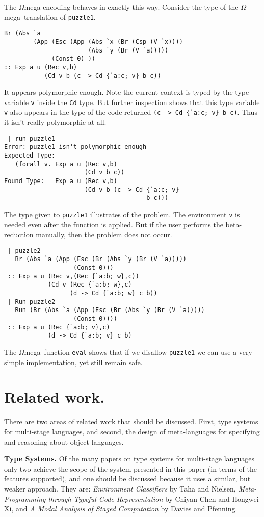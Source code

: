 \documentclass{sigplanconf}
\newcommand{\om}{$\Omega$mega}
\begin{document}
\begin{itemize}
The \om{} encoding behaves in exactly this way. Consider
the type of the \om\ translation of {\tt puzzle1}.
\begin{verbatim}
Br (Abs `a 
        (App (Esc (App (Abs `x (Br (Csp (V `x)))) 
                       (Abs `y (Br (V `a)))))
             (Const 0) ))
:: Exp a u (Rec v,b) 
           (Cd v b (c -> Cd {`a:c; v} b c))
\end{verbatim}
It appears polymorphic enough. Note the current
context is typed by the type variable {\tt v} inside the {\tt Cd} type. But further
inspection shows that this type variable {\tt v} also appears
in the type of the code returned \verb+(c -> Cd {`a:c; v} b c)+.
Thus it isn't really polymorphic at all.
\begin{verbatim}
-| run puzzle1
Error: puzzle1 isn't polymorphic enough
Expected Type: 
   (forall v. Exp a u (Rec v,b) 
                      (Cd v b c))
Found Type:   Exp a u (Rec v,b) 
                      (Cd v b (c -> Cd {`a:c; v} 
                                       b c)))
\end{verbatim}
The type given to \verb|puzzle1| illustrates of the problem.  The 
environment \verb|v| is needed even after the function is applied.
But if the user performs the beta-reduction
manually, then the problem does not occur.  
{\small
\begin{verbatim}
-| puzzle2
   Br (Abs `a (App (Esc (Br (Abs `y (Br (V `a))))) 
                   (Const 0)))
 :: Exp a u (Rec v,(Rec {`a:b; w},c))
            (Cd v (Rec {`a:b; w},c) 
                  (d -> Cd {`a:b; w} c b))
-| Run puzzle2
   Run (Br (Abs `a (App (Esc (Br (Abs `y (Br (V `a))))) 
                   (Const 0))))
 :: Exp a u (Rec {`a:b; v},c) 
            (d -> Cd {`a:b; v} c b)
\end{verbatim}}
\end{itemize}

The \om\ function {\tt eval} shows that if we disallow {\tt puzzle1}
we can use a very simple implementation, yet still remain safe.

\section{Related work.}

There are two areas of related work that should be discussed.
First, type systems for multi-stage languages, and second, the
design of meta-languages for specifying and reasoning about
object-languages. 

{\bf Type Systems.} Of the many papers on type systems for multi-stage languages
only two achieve the scope of the system presented in this paper
(in terms of the features supported), and one should be
discussed because it uses a similar, but weaker approach.
They are:
{\it Environment Classifiers}\cite{TahNie03} by Taha and Nielsen, 
{\it Meta-Programming through Typeful Code Representation}\cite{XiChen2003}
by Chiyan Chen and Hongwei Xi, 
and {\it A Modal Analysis of Staged Computation} by Davies and Pfenning.
\end{document}
